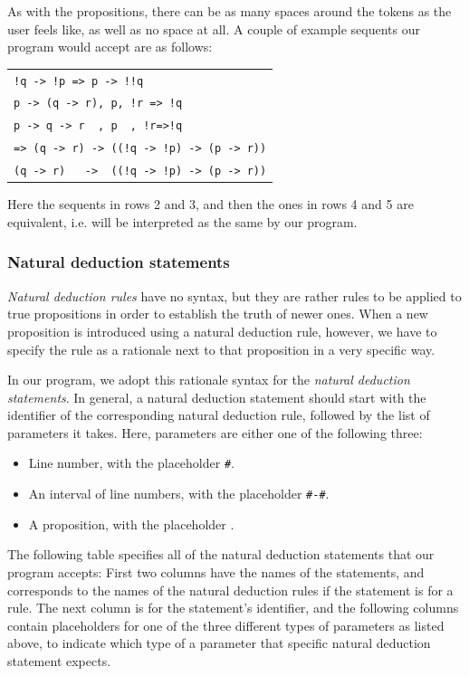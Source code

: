 \documentclass{article}
\begin{document}
As with the propositions, there can be as many spaces around the tokens as
the user feels like, as well as no space at all. A couple of example sequents
our program would accept are as follows:

\begin{center}
	\begin{tabular}{l}
		\verb^!q -> !p => p -> !!q^\\
		\verb^p -> (q -> r), p, !r => !q^\\
		\verb^p -> q -> r  , p  , !r=>!q^\\
		\verb^=> (q -> r) -> ((!q -> !p) -> (p -> r))^\\
		\verb^(q -> r)   ->  ((!q -> !p) -> (p -> r))^
	\end{tabular}
\end{center}

Here the sequents in rows 2 and 3, and then the ones in rows 4 and 5
are equivalent, i.e. will be interpreted as the same by our program.

\subsubsection{Natural deduction statements}\label{sec:spec_nd}

\textit{Natural deduction rules} have no syntax, but they are rather rules to be
applied to true propositions in order to establish the truth of newer ones.
When a new proposition is introduced using a natural deduction rule, however,
we have to specify the rule as a rationale next to that proposition in a
very specific way.

\newcommand{\AN}{\texttt{\#}}
\newcommand{\AR}{\texttt{\#-\#}}
\newcommand{\AF}{\texttt{\textphi}}

In our program, we adopt this rationale syntax for the
\textit{natural deduction statements}. In general, a natural deduction statement
should start with the identifier of the corresponding natural deduction rule,
followed by the list of parameters it takes. Here, parameters are either one of
the following three:
\begin{itemize}
	\item Line number, with the placeholder \AN.
	\item An interval of line numbers, with the placeholder \AR.
	\item A proposition, with the placeholder \AF.
\end{itemize}

The following table specifies all of the natural deduction statements that our
program accepts: First two columns have the names of the statements,
and corresponds to the names of the natural deduction rules if the
statement is for a rule. The next column is for the statement's identifier,
and the following columns contain placeholders for one of the three
different types of parameters as listed above, to indicate which type
of a parameter that specific natural deduction statement expects.
\end{document}
